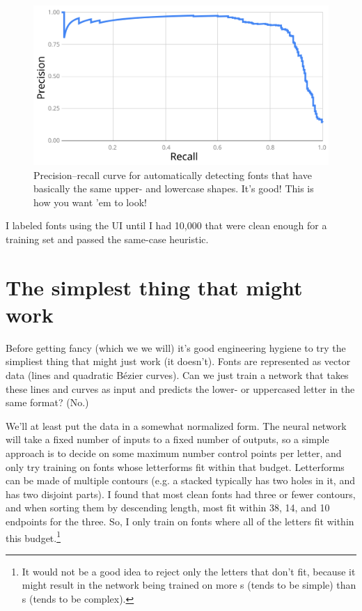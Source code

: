 \documentclass[twocolumn]{amsart}
\begin{document}
\begin{figure}[ht]
\includegraphics[width=0.9 \linewidth]{samecasepr}
\caption{ Precision--recall curve for automatically detecting fonts
  that have basically the same upper- and lowercase shapes. It's good!
  This is how you want 'em to look!
} \label{fig:samecasepr}
\end{figure}

\medskip

I labeled fonts using the UI until I had 10,000 that were clean enough
for a training set and passed the same-case heuristic.

\section{The simplest thing that might work} \label{sec:vectorversion}

Before getting fancy (which we we will) it's good engineering hygiene
to try the simpliest thing that might just work (it doesn't). Fonts
are represented as vector data (lines and quadratic B\'ezier curves).
Can we just train a network that takes these lines and curves as input
and predicts the lower- or uppercased letter in the same format? (No.)

We'll at least put the data in a somewhat normalized form. The neural
network will take a fixed number of inputs to a fixed number of
outputs, so a simple approach is to decide on some maximum number
control points per letter, and only try training on fonts whose
letterforms fit within that budget. Letterforms can be made of
multiple contours (e.g. a stacked  typically has two
holes in it, and  has two disjoint parts). I found that
most clean fonts had three or fewer contours, and when sorting them by
descending length, most fit within 38, 14, and 10 endpoints for the
three. So, I only train on fonts where all of the letters fit within
this budget.\footnote{It would not be a good idea to reject only the letters
that don't fit, because it might result in the network being trained
on more s (tends to be simple) than s
(tends to be complex).}
\end{document}
